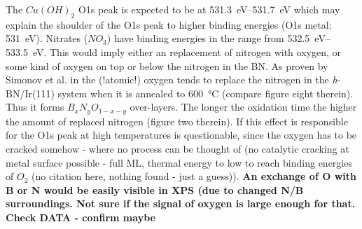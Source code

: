 The $Cu(OH)_2$ O1s peak is expected to be at \SIrange{531.3}{531.7}{\eV}\cite{deroubaix_x-ray_1992} which may explain the shoulder of the O1s peak to higher binding energies (O1s metal: \SI{531}{\eV}). Nitrates ($NO_3$) have binding energies in the range from \SIrange{532.5}{533.5}{\eV}\cite[45]{wanger_handbook_1979}. This would imply either an replacement of nitrogen with oxygen, or some kind of oxygen on top or below the nitrogen in the BN. As proven by Simonov et al. in \cite{simonov_controllable_2012} the (!atomic!) oxygen tends to replace the nitrogen in the \textit{h}-BN/Ir(111) system when it is annealed to \SI{600}{\degreeCelsius} (compare figure eight therein). Thus it forms $B_{x}N_{y}O_{1-x-y}$ over-layers. The longer the oxidation time the higher the amount of replaced nitrogen (figure two therein). If this effect is responsible for the O1s peak at high temperatures is questionable, since the oxygen has to be cracked somehow - where no process can be thought of (no catalytic cracking at metal surface possible - full ML, thermal energy to low to reach binding energies of $O_2$ (no citation here, nothing found - just a guess)).
% 
% 
\textbf{An exchange of O with B or N would be easily visible in XPS (due to changed N/B surroundings. Not sure if the signal of oxygen is large enough for that. Check DATA - confirm maybe}
